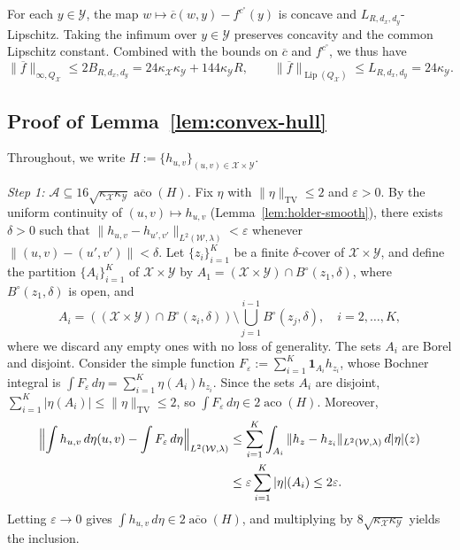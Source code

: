 \documentclass[11pt]{amsart}
\theoremstyle{definition}
\theoremstyle{remark}
\newcommand{\1}{\mathbf{1}}
\newcommand{\Lip}{\operatorname{Lip}}
\numberwithin{equation}{section}
\newcommand{\TV}{\mathrm{TV}}
\begin{document}
For each $y\in\mathcal Y$, the map
$w\mapsto\overline c(w,y)-f^{c^\circ}(y)$ is concave and
$L_{R,d_x,d_y}$-Lipschitz. Taking the infimum over $y\in\mathcal Y$
preserves concavity and the common Lipschitz constant. Combined with the
bounds on $\overline c$ and $f^{c^\circ}$, we thus have
\[
\|\overline f\|_{\infty,Q_{\mathcal X}}
\le 2B_{R,d_x,d_y}
=24\kappa_{\mathcal X}\kappa_{\mathcal Y}
+144\kappa_{\mathcal Y}R,
\qquad
\|\overline f\|_{\Lip(Q_{\mathcal X})}
\le L_{R,d_x,d_y}
=24\kappa_{\mathcal Y}.
\]





\subsection{Proof of Lemma~\ref{lem:convex-hull}}
\label{pf:convex-hull}
Throughout, we write $H:=\{h_{u,v}\}_{(u,v)\in\mathcal X\times\mathcal Y}$.

\emph{Step 1: $\mathcal A\subseteq
16\sqrt{\kappa_\mathcal{X}\kappa_\mathcal{Y}}
\overline{\operatorname{aco}}(H)$.}
Fix $\eta$ with $\|\eta\|_{\TV}\le2$ and $\varepsilon>0$. By the
uniform continuity of $(u,v)\mapsto h_{u,v}$ (Lemma~\ref{lem:holder-smooth}), there exists
$\delta>0$ such that
$\|h_{u,v}-h_{u',v'}\|_{L^2(\mathcal W,\lambda)}<\varepsilon$ whenever
$\|(u,v)-(u',v')\|<\delta$. Let $\{z_i\}_{i=1}^K$ be a finite
$\delta$-cover of $\mathcal X\times\mathcal Y$, and define the partition
$\{A_i\}_{i=1}^K$ of $\mathcal X\times\mathcal Y$ by $A_1=(\mathcal X\times \mathcal Y) \cap B^{\circ}(z_1,\delta)$, where $B^{\circ}(z_1,\delta)$ is open, and 
\[A_i=((\mathcal X\times \mathcal Y) \cap B^{\circ}(z_i,\delta))\setminus\bigcup_{j=1}^{i-1}B^{\circ}(z_j,\delta),
\quad i=2,\ldots,K,\]
where we discard any empty ones with no loss of generality. The sets $A_i$
are Borel and disjoint. Consider the simple function
$F_\varepsilon:=\sum_{i=1}^K\mathbf 1_{A_i}h_{z_i}$, whose Bochner
integral is
$\int F_\varepsilon\,d\eta=\sum_{i=1}^K\eta(A_i)h_{z_i}$.
Since the sets $A_i$ are disjoint,
$\sum_{i=1}^K|\eta(A_i)|\le\|\eta\|_{\TV}\le2$, so
$\int F_\varepsilon\,d\eta\in2\operatorname{aco}(H)$. Moreover,
\begin{align*}
\Bigl\|\int h_{u,v}\,d\eta(u,v)-\int F_\varepsilon\,d\eta\Bigr\|
_{L^2(\mathcal W,\lambda)}
&\le\sum_{i=1}^K\int_{A_i}\|h_{z}-h_{z_i}\|_{L^2(\mathcal W,\lambda)}
\,d|\eta|(z)\\
&\le\varepsilon\sum_{i=1}^K|\eta|(A_i)\le2\varepsilon.
\end{align*}
Letting $\varepsilon\to0$ gives $\int h_{u,v}\,d\eta\in
2\overline{\operatorname{aco}}(H)$, and multiplying by
$8\sqrt{\kappa_\mathcal{X}\kappa_\mathcal{Y}}$ yields the inclusion.
\end{document}
